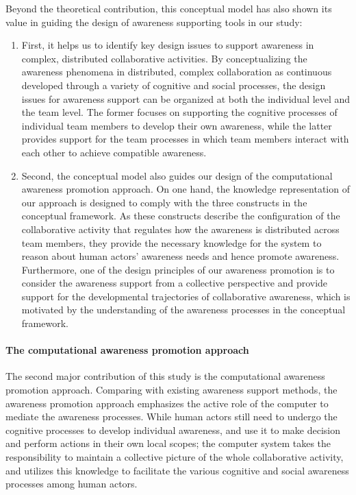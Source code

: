Beyond the theoretical contribution, this conceptual model has also shown its value in guiding the design of awareness supporting tools in our study:

\begin{enumerate}
	\item First, it helps us to identify key design issues to support awareness in complex, distributed collaborative activities. By conceptualizing the awareness phenomena in distributed, complex collaboration as continuous developed through a variety of cognitive and social processes, the design issues for awareness support can be organized at both the individual level and the team level. The former focuses on supporting the cognitive processes of individual team members to develop their own awareness, while the latter provides support for the team processes in which team members interact with each other to achieve compatible awareness.
	\item Second, the conceptual model also guides our design of the computational awareness promotion approach. On one hand, the knowledge representation of our approach is designed to comply with the three constructs in the conceptual framework. As these constructs describe the configuration of the collaborative activity that regulates how the awareness is distributed across team members, they provide the necessary knowledge for the system to reason about human actors' awareness needs and hence promote awareness. Furthermore, one of the design principles of our awareness promotion is to consider the awareness support from a collective perspective and provide support for the developmental trajectories of collaborative awareness, which is motivated by the understanding of the awareness processes in the conceptual framework.
\end{enumerate}

\paragraph*{The computational awareness promotion approach} %
\label{par:the_awareness_promotion_approach}
The second major contribution of this study is the computational awareness promotion approach. Comparing with existing awareness support methods, the awareness promotion approach emphasizes the active role of the computer to mediate the awareness processes. While human actors still need to undergo the cognitive processes to develop individual awareness, and use it to make decision and perform actions in their own local scopes; the computer system takes the responsibility to maintain a collective picture of the whole collaborative activity, and utilizes this knowledge to facilitate the various cognitive and social awareness processes among human actors. 

